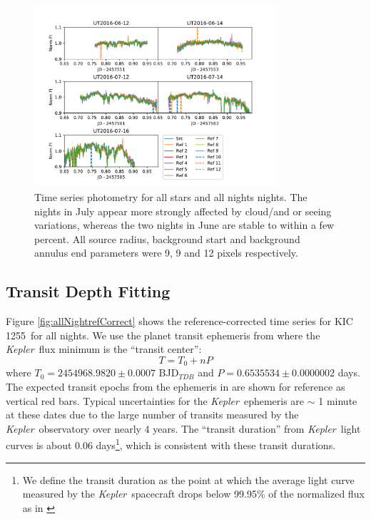 \documentclass[preprint]{aastex61}
\newcommand{\shStar}{KIC 1255}
\newcommand{\kepler}{{\it Kepler}}
\begin{document}
\begin{figure}
\begin{centering}
\includegraphics[width=0.8\textwidth]{images/all_kic1255_phot/all_kic1255_allstar.pdf}
\caption{Time series photometry for all stars and all nights nights.
The nights in July appear more strongly affected by cloud/and or seeing variations, whereas the two nights in June are stable to within a few percent.
All source radius, background start and background annulus end parameters were 9, 9 and 12 pixels respectively.}\label{fig:allNightallStar}
\end{centering}
\end{figure}

\subsection{Transit Depth Fitting}\label{sec:transFitting}

Figure \ref{fig:allNightrefCorrect} shows the reference-corrected time series for \shStar\ for all nights.
We use the planet transit ephemeris from \citet{croll2015starspots} where the \kepler\ flux minimum is the ``transit center'':
\begin{equation}\label{eq:ephem}
T = T_0 + n P
\end{equation}
where $T_0 = 2 454 968.982 0 \pm 0.000 7$ BJD$_{TDB}$ and $P = 0.653 553 4 \pm 0.000 000 2$ days.
The expected transit epochs from the ephemeris in \citep{vanWerkhoven2014} are shown for reference as vertical red bars.
Typical uncertainties for the \kepler\ ephemeris are $\sim$ 1 minute at these dates due to the large number of transits measured by the \kepler\ observatory over nearly 4 years.
The ``transit duration'' from \kepler\ light curves is about 0.06 days\footnote{We define the transit duration as the point at which the average light curve measured by the \kepler\ spacecraft drops below 99.95\% of the normalized flux as in \citet{schlawin2016kic1255}}, which is consistent with these transit durations.
\end{document}

